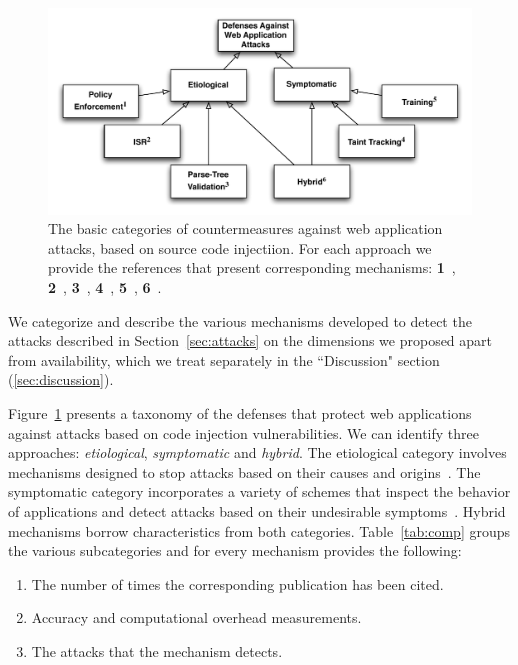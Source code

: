 \documentclass[conference]{IEEEtran}
\begin{document}
\begin{figure} [ht]
\begin{center}
\leavevmode
\includegraphics[scale=0.65]{defenses.pdf}
\end{center}
\caption{\label{fig:defenses}The basic categories of countermeasures
against web application attacks, based on source code
injectiion. For each approach we provide the references
that present corresponding mechanisms:
{\bf 1}~\cite{NSS06,JKK06a,KKVJ06,KJKV09,TNH07,RDWDE07,YCIS07,OWVS08,PSC09,ML10,DDHPJ10,PS11,VDDPJ11,BV08,LV09},
{\bf 2}~\cite{BK04,JB07,GC09,APKLM10},
{\bf 3}~\cite{BWS05,SW06},
{\bf 4}~\cite{HCF05,PB05,XBS06,NLC07,VFJKKV07,PMP11,SLMS14},
{\bf 5}~\cite{LLW02,HO05,HO06,HO05b,VMV05,JEP08,WPLKK09,MS09,MKS09,MKLS11},
{\bf 6}~\cite{BV08,LV09,SMS13}.}
\end{figure}

We categorize and describe the various mechanisms developed to detect
the attacks described in Section~\ref{sec:attacks} on the dimensions
we proposed apart from availability, which we treat separately in the
``Discussion" section (\ref{sec:discussion}).

Figure~\ref{fig:defenses} presents a taxonomy of the
defenses that protect web applications against attacks based on
code injection vulnerabilities.
We can identify three approaches:
{\it etiological}, {\it symptomatic} and {\it hybrid}.
The etiological category involves mechanisms designed to
stop attacks based on their causes and origins~\cite{JL75,L81}. 
The symptomatic category incorporates a variety of schemes that
inspect the behavior of applications and detect attacks based on
their undesirable symptoms~\cite{D76,A00}.
Hybrid mechanisms borrow characteristics from both
categories. Table~\ref{tab:comp} groups the various subcategories and
for every mechanism provides the following:

\begin{enumerate}
\item The number of times the corresponding publication has been cited.
\item Accuracy and computational overhead measurements.
\item The attacks that the mechanism detects.
\end{enumerate}
\end{document}
